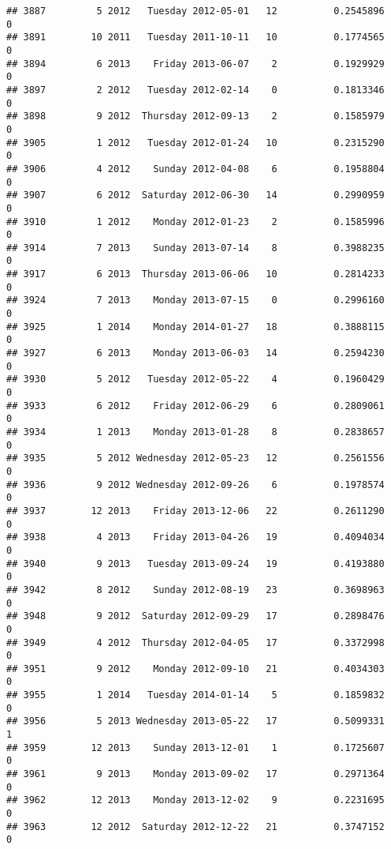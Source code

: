\documentclass[
]{article}
\begin{document}
\begin{verbatim}
## 3887         5 2012   Tuesday 2012-05-01   12          0.2545896             0
## 3891        10 2011   Tuesday 2011-10-11   10          0.1774565             0
## 3894         6 2013    Friday 2013-06-07    2          0.1929929             0
## 3897         2 2012   Tuesday 2012-02-14    0          0.1813346             0
## 3898         9 2012  Thursday 2012-09-13    2          0.1585979             0
## 3905         1 2012   Tuesday 2012-01-24   10          0.2315290             0
## 3906         4 2012    Sunday 2012-04-08    6          0.1958804             0
## 3907         6 2012  Saturday 2012-06-30   14          0.2990959             0
## 3910         1 2012    Monday 2012-01-23    2          0.1585996             0
## 3914         7 2013    Sunday 2013-07-14    8          0.3988235             0
## 3917         6 2013  Thursday 2013-06-06   10          0.2814233             0
## 3924         7 2013    Monday 2013-07-15    0          0.2996160             0
## 3925         1 2014    Monday 2014-01-27   18          0.3888115             0
## 3927         6 2013    Monday 2013-06-03   14          0.2594230             0
## 3930         5 2012   Tuesday 2012-05-22    4          0.1960429             0
## 3933         6 2012    Friday 2012-06-29    6          0.2809061             0
## 3934         1 2013    Monday 2013-01-28    8          0.2838657             0
## 3935         5 2012 Wednesday 2012-05-23   12          0.2561556             0
## 3936         9 2012 Wednesday 2012-09-26    6          0.1978574             0
## 3937        12 2013    Friday 2013-12-06   22          0.2611290             0
## 3938         4 2013    Friday 2013-04-26   19          0.4094034             0
## 3940         9 2013   Tuesday 2013-09-24   19          0.4193880             0
## 3942         8 2012    Sunday 2012-08-19   23          0.3698963             0
## 3948         9 2012  Saturday 2012-09-29   17          0.2898476             0
## 3949         4 2012  Thursday 2012-04-05   17          0.3372998             0
## 3951         9 2012    Monday 2012-09-10   21          0.4034303             0
## 3955         1 2014   Tuesday 2014-01-14    5          0.1859832             0
## 3956         5 2013 Wednesday 2013-05-22   17          0.5099331             1
## 3959        12 2013    Sunday 2013-12-01    1          0.1725607             0
## 3961         9 2013    Monday 2013-09-02   17          0.2971364             0
## 3962        12 2013    Monday 2013-12-02    9          0.2231695             0
## 3963        12 2012  Saturday 2012-12-22   21          0.3747152             0

\end{verbatim}
\end{document}
